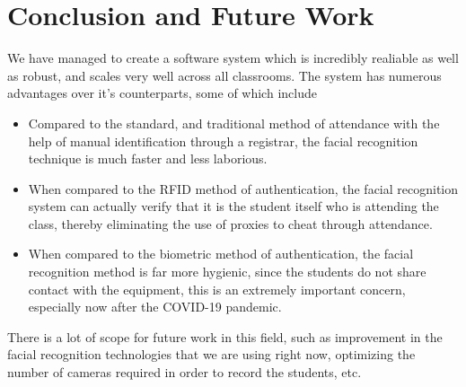 \documentclass[conference]{IEEEtran}
\begin{document}
\section{Conclusion and Future Work}
We have managed to create a software system which is incredibly realiable as well as robust, and scales very well across all classrooms. The system has numerous advantages over it's counterparts, some of which include
\begin{itemize}
    \item Compared to the standard, and traditional method of attendance with the help of manual identification through a registrar, the facial recognition technique is much faster and less laborious.
    \item When compared to the RFID method of authentication, the facial recognition system can actually verify that it is the student itself who is attending the class, thereby eliminating the use of proxies to cheat through attendance.
    \item When compared to the biometric method of authentication, the facial recognition method is far more hygienic, since the students do not share contact with the equipment, this is an extremely important concern, especially now after the COVID-19 pandemic. 
\end{itemize}
There is a lot of scope for future work in this field, such as improvement in the facial recognition technologies that we are using right now, optimizing the number of cameras required in order to record the students, etc. 
\end{document}
